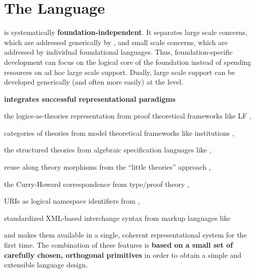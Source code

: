 \section{The \mmt Language}

\mmt is systematically \textbf{foundation-independent}.
It separates large scale concerns, which are addressed generically by {\mmt}, and small scale concerns, which are addressed by individual foundational languages.
Thus, foundation-specific development can focus on the logical core of the foundation instead of spending resources on ad hoc large scale support.
Dually, large scale support can be developed generically (and often more easily) at the {\mmt} level.

\mmt \textbf{integrates successful representational paradigms}
\begin{compactitem}
\item the logics-as-theories representation from proof theoretical frameworks like LF \cite{lf},
\item categories of theories from model theoretical frameworks like institutions \cite{institutions},
\item the structured theories from algebraic specification languages like \cite{asl},
\item reuse along theory morphisms from the ``little theories'' approach \cite{littletheories},
\item the Curry-Howard correspondence from type/proof theory \cite{curry,howard},
\item URIs as logical namespace identifiers from {\openmath} \cite{openmath},
\item standardized XML-based interchange syntax from markup languages like {\omdoc} \cite{omdoc}
\end{compactitem}
and makes them available in a single, coherent representational system for the first time.
The combination of these features is \textbf{based on a small set of carefully chosen, orthogonal primitives} in order to obtain a simple and extensible language design.

